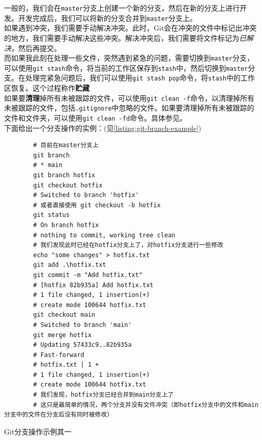 一般的，我们会在\texttt{master}分支上创建一个新的分支，然后在新的分支上进行开发。开发完成后，我们可以将新的分支合并到\texttt{master}分支上。\\

如果遇到冲突，我们需要手动解决冲突。此时，Git会在冲突的文件中标记出冲突的地方，我们需要手动解决这些冲突。解决冲突后，我们需要将文件标记为\textit{已解决}，然后再提交。\\

而如果我此刻在处理一些文件，突然遇到紧急的问题，需要切换到\texttt{master}分支，可以使用\texttt{git stash}命令，将当前的工作区保存到\texttt{stash}中，然后切换到\texttt{master}分支。在处理完紧急问题后，我们可以使用\texttt{git stash pop}命令，将\texttt{stash}中的工作区恢复。这个过程称作\textbf{贮藏}\\

如果要\textbf{清理}掉所有未被跟踪的文件，可以使用\texttt{git clean -f}命令，以清理掉所有未被跟踪的文件，包括\texttt{.gitignore}中忽略的文件。如果要清理掉所有未被跟踪的文件和文件夹，可以使用\texttt{git clean -fd}命令。具体参见\citep{Stash&Clean}。\\

下面给出一个分支操作的实例：(见\autoref{listing:git-branch-example})

\begin{longlisting}
    \begin{verbatim}
        # 目前在master分支上
        git branch
        # * main
        git branch hotfix
        git checkout hotfix
        # Switched to branch 'hotfix'
        # 或者直接使用 git checkout -b hotfix
        git status
        # On branch hotfix
        # nothing to commit, working tree clean
        # 我们发现此时已经在hotfix分支上了，对hotfix分支进行一些修改
        echo "some changes" > hotfix.txt
        git add .\hotfix.txt
        git commit -m "Add hotfix.txt"
        # [hotfix 82b935a] Add hotfix.txt
        # 1 file changed, 1 insertion(+)
        # create mode 100644 hotfix.txt
        git checkout main
        # Switched to branch 'main'
        git merge hotfix
        # Updating 57433c9..82b935a
        # Fast-forward
        # hotfix.txt | 1 +
        # 1 file changed, 1 insertion(+)
        # create mode 100644 hotfix.txt
        # 我们发现，hotfix分支已经合并到main分支上了
        # 这只是最简单的情况，两个分支并没有文件冲突（即hotfix分支中的文件和main分支中的文件在分支后没有同时被修改）
    \end{verbatim}
    \caption{Git分支操作示例其一}
    \label{listing:git-branch-example-1}
\end{longlisting}

